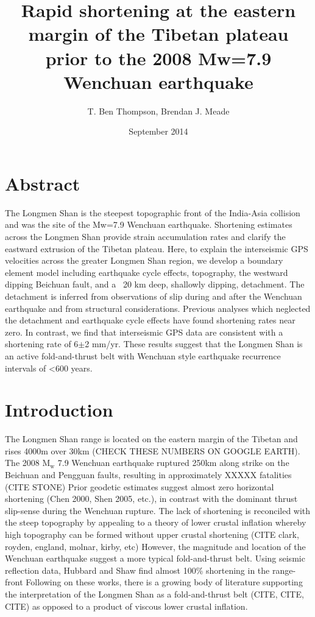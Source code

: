 \documentclass{article}
\title{Rapid shortening at the eastern margin of the Tibetan plateau prior to the 2008 Mw=7.9 Wenchuan earthquake}
\author{T. Ben Thompson, Brendan J. Meade}
\date{September 2014}
\begin{document}
\maketitle

\section{Abstract}
The Longmen Shan is the steepest topographic front of the India-Asia collision and was the site of the Mw=7.9 Wenchuan earthquake.
Shortening estimates across the Longmen Shan provide strain accumulation rates and clarify the eastward extrusion of the Tibetan plateau.
Here, to explain the interseismic GPS velocities across the greater Longmen Shan region, we develop a boundary element model including earthquake cycle effects, topography, the westward dipping Beichuan fault, and a ~20 km deep, shallowly dipping, detachment.
The detachment is inferred from observations of slip during and after the Wenchuan earthquake and from structural considerations.
Previous analyses which neglected the detachment and earthquake cycle effects have found shortening rates near zero.
In contrast, we find that interseismic GPS data are consistent with a shortening rate of 6$\pm$2 mm/yr.
These results suggest that the Longmen Shan is an active fold-and-thrust belt with Wenchuan style earthquake recurrence intervals of <600 years.

\section{Introduction}
The Longmen Shan range is located on the eastern margin of the Tibetan and rises 4000m over 30km (CHECK THESE NUMBERS ON GOOGLE EARTH).
The 2008 $\mathrm{M_w}$ 7.9 Wenchuan earthquake ruptured 250km along strike on the Beichuan and Pengguan faults, resulting in approximately XXXXX fatalities (CITE STONE)
Prior geodetic estimates suggest almost zero horizontal shortening (Chen 2000, Shen 2005, etc.), in contrast with the dominant thrust slip-sense during the Wenchuan rupture. 
The lack of shortening is reconciled with the steep topography by appealing to a theory of lower crustal inflation whereby high topography can be formed without upper crustal shortening (CITE clark, royden, england, molnar, kirby, etc)
However, the magnitude and location of the Wenchuan earthquake suggest a more typical fold-and-thrust belt.
Using seismic reflection data, Hubbard and Shaw find almost 100\% shortening in the range-front 
Following on these works, there is a growing body of literature supporting the interpretation of the Longmen Shan as a fold-and-thrust belt (CITE, CITE, CITE) as opposed to a product of viscous lower crustal inflation.
\end{document}
